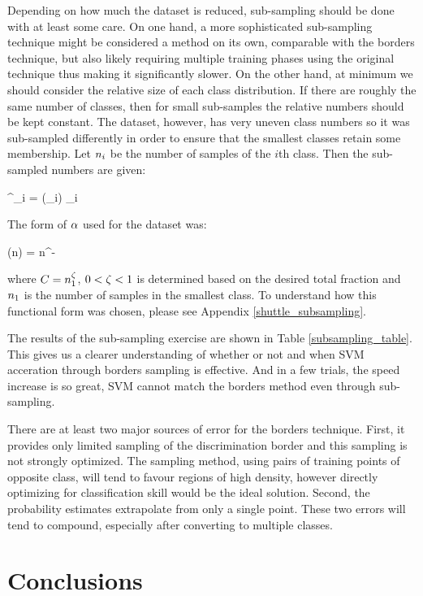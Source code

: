 Depending on how much the dataset is reduced, sub-sampling should be done with at
least some care. 
On one hand, a more sophisticated sub-sampling technique might be considered a method on its own, 
comparable with the borders technique, but also likely requiring multiple training phases using the
original technique thus making it significantly slower.
On the other hand, at minimum we should consider the relative size of each class distribution.
If there are roughly the same number of classes, then for small sub-samples the relative
numbers should be kept constant.
The  dataset, however, has very uneven class numbers so it was sub-sampled differently
in order to ensure that the smallest classes retain some membership.
Let $n_i$ be the number of samples of the $i$th class.
Then the sub-sampled numbers are given:
\begin{eqnnon}
	\classsize^\prime_i = \subsample(\classsize_i) \classsize_i
	\label{subsample}
\end{eqnnon}
The form of $\alpha$ used for the  dataset was:
\begin{eqnnon}
	\subsample(n) = \submultcoef n^{-\subexp}
	\label{subfunction}
\end{eqnnon}
where $C=n_1^\zeta$, $0 < \zeta < 1$ is determined based on the
desired total fraction and $n_1$ is the number of samples in the 
smallest class.
To understand how this functional form was chosen, please see Appendix \ref{shuttle_subsampling}.

The results of the sub-sampling exercise are shown in Table \ref{subsampling_table}.
This gives us a clearer understanding of whether or not and
when SVM acceration through borders sampling is effective.
And in a few trials, the speed increase is so great, SVM cannot match the borders
method even through sub-sampling.

There are at least two major sources of error for the borders technique.
First, it provides only limited sampling of the discrimination
border and this sampling is not strongly optimized.
The sampling method, using pairs of training points of opposite class, will
tend to favour regions of high density, however  
directly optimizing for classification skill would be the ideal solution.
Second, the probability estimates extrapolate from only a single point.
These two errors will tend to compound, especially after converting to
multiple classes.

\section{Conclusions}

